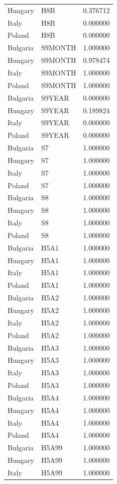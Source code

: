 \begin{tabular}{llr}
Hungary & H8B & 0.376712 \\
Italy & H8B & 0.000000 \\
Poland & H8B & 0.000000 \\
Bulgaria & S9MONTH & 1.000000 \\
Hungary & S9MONTH & 0.978474 \\
Italy & S9MONTH & 1.000000 \\
Poland & S9MONTH & 1.000000 \\
Bulgaria & S9YEAR & 0.000000 \\
Hungary & S9YEAR & 0.189824 \\
Italy & S9YEAR & 0.000000 \\
Poland & S9YEAR & 0.000000 \\
Bulgaria & S7 & 1.000000 \\
Hungary & S7 & 1.000000 \\
Italy & S7 & 1.000000 \\
Poland & S7 & 1.000000 \\
Bulgaria & S8 & 1.000000 \\
Hungary & S8 & 1.000000 \\
Italy & S8 & 1.000000 \\
Poland & S8 & 1.000000 \\
Bulgaria & H5A1 & 1.000000 \\
Hungary & H5A1 & 1.000000 \\
Italy & H5A1 & 1.000000 \\
Poland & H5A1 & 1.000000 \\
Bulgaria & H5A2 & 1.000000 \\
Hungary & H5A2 & 1.000000 \\
Italy & H5A2 & 1.000000 \\
Poland & H5A2 & 1.000000 \\
Bulgaria & H5A3 & 1.000000 \\
Hungary & H5A3 & 1.000000 \\
Italy & H5A3 & 1.000000 \\
Poland & H5A3 & 1.000000 \\
Bulgaria & H5A4 & 1.000000 \\
Hungary & H5A4 & 1.000000 \\
Italy & H5A4 & 1.000000 \\
Poland & H5A4 & 1.000000 \\
Bulgaria & H5A99 & 1.000000 \\
Hungary & H5A99 & 1.000000 \\
Italy & H5A99 & 1.000000 \\

\end{tabular}
